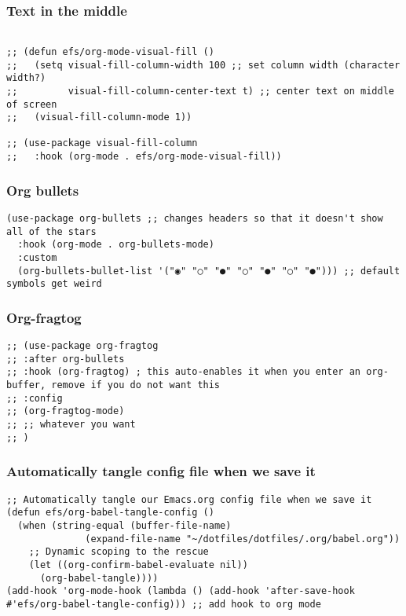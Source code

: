 \documentclass[11pt]{article}
\begin{document}
\subsubsection{Text in the middle}
\label{sec:org9b515f7}
\begin{verbatim}

;; (defun efs/org-mode-visual-fill ()
;;   (setq visual-fill-column-width 100 ;; set column width (character width?)
;;         visual-fill-column-center-text t) ;; center text on middle of screen
;;   (visual-fill-column-mode 1))

;; (use-package visual-fill-column
;;   :hook (org-mode . efs/org-mode-visual-fill))
\end{verbatim}
\subsubsection{Org bullets}
\label{sec:org452f434}
\begin{verbatim}
(use-package org-bullets ;; changes headers so that it doesn't show all of the stars
  :hook (org-mode . org-bullets-mode)
  :custom
  (org-bullets-bullet-list '("◉" "○" "●" "○" "●" "○" "●"))) ;; default symbols get weird
\end{verbatim}
\subsubsection{Org-fragtog}
\label{sec:org9ba0da0}
\begin{verbatim}
;; (use-package org-fragtog
;; :after org-bullets
;; :hook (org-fragtog) ; this auto-enables it when you enter an org-buffer, remove if you do not want this
;; :config
;; (org-fragtog-mode)
;; ;; whatever you want
;; )
\end{verbatim}
\subsubsection{Automatically tangle config file when we save it}
\label{sec:org00d9bf3}
\begin{verbatim}
;; Automatically tangle our Emacs.org config file when we save it
(defun efs/org-babel-tangle-config ()
  (when (string-equal (buffer-file-name)
		      (expand-file-name "~/dotfiles/dotfiles/.org/babel.org"))
    ;; Dynamic scoping to the rescue
    (let ((org-confirm-babel-evaluate nil))
      (org-babel-tangle))))
(add-hook 'org-mode-hook (lambda () (add-hook 'after-save-hook #'efs/org-babel-tangle-config))) ;; add hook to org mode
\end{verbatim}
\end{document}

